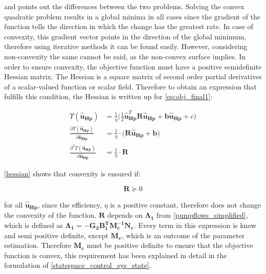   and  points out the differences between the two problems. Solving the convex quadratic problem results in a global minima in all cases since the gradient of the function tells the direction in which the change has the greatest rate. In case of convexity, this gradient vector points in the direction of the global minimum, therefore using iterative methods it can be found easily. However, considering non-convexity the same cannot be said, as the non-convex surface implies. 
 In order to ensure convexity, the objective function must have a positive semidefinite Hessian matrix. The Hessian is a square matrix of second order partial derivatives of a scalar-valued function or scalar field. Therefore to obtain an expression that fulfills this condition, the Hessian is written up for \eqref{eq:obj_final1}: 

\begin{align}
%
\Upsilon(\bm{\hat{u}}_{\bm{Hp}}) &= \frac{1}{\eta}\bigg( \frac{1}{2} \bm{\hat{u}}_{\bm{Hp}}^{T} \bm{R} \bm{\hat{u}}_{\bm{Hp}} + \bm{b} \bm{\hat{u}}_{\bm{Hp}} + c \bigg)\\
%
\frac{\partial \Upsilon(\bm{\hat{u}}_{\bm{Hp}})}{\partial \bm{\hat{u}}_{\bm{Hp}}} &= \frac{1}{\eta}\cdot \big(\bm{R} \bm{\hat{u}}_{\bm{Hp}} + \bm{b} \big)\\
%
\frac{\partial^2 \Upsilon(\bm{\hat{u}}_{\bm{Hp}})}{\partial \bm{\hat{u}}_{\bm{Hp}}} &= \frac{1}{\eta}\cdot \bm{R} 
\label{hessian}
%
\end{align}

\eqref{hessian} shows that convexity is ensured if:

\begin{equation}
\bm{R} \succeq 0  
\end{equation}

for all $\bm{\hat{u}}_{\bm{Hp}} $, since the efficiency, $\eta$ is a positive constant, therefore does not change the convexity of the function. $\bm{R}$ depends on $\bm{\Lambda_1}$ from \eqref{pumpflows_simplified}, which is defined as $\bm{\Lambda_1} = -\bm{G_{2}} \bm{B_{1}^T}\bm{M_c^{-1}}\bm{N_c}$. Every term in this expression is know and semi positive definite, except $\bm{M_c}$, which is an outcome of the parameter estimation. Therefore $\bm{M_c}$ must be positive definite to ensure that the objective function is convex, this requirement has been explained in detail in the formulation of \eqref{statespace_control_sys_state}.  







